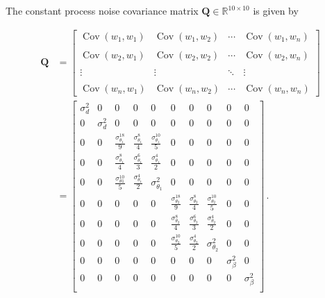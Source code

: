 The constant process noise covariance matrix $\mathbf{Q} \in \mathbb{R}^{10 \times 10}$ is given by

\begin{equation}
\begin{split}
\mathbf{Q} &= \begin{bmatrix}
 \operatorname{Cov}(w_1,w_1) & \operatorname{Cov}(w_1,w_2) & \cdots & \operatorname{Cov}(w_1,w_n) \\ \\
 \operatorname{Cov}(w_2,w_1) & \operatorname{Cov}(w_2,w_2) & \cdots & \operatorname{Cov}(w_2,w_n) \\ \\
 \vdots & \vdots & \ddots & \vdots \\ \\
 \operatorname{Cov}(w_n,w_1) & \operatorname{Cov}(w_n,w_2) & \cdots & \operatorname{Cov}(w_n,w_n)
\end{bmatrix} \\
&= \begin{bmatrix}
  \sigma^2_d & 0 & 0 & 0 & 0 & 0 & 0 & 0 & 0 & 0\\
  0 & \sigma^2_d & 0 & 0 & 0 & 0 & 0 & 0 & 0 & 0\\
  0 & 0 & \frac{\sigma^{18}_{\theta_1}}{9} & \frac{\sigma^8_{\theta_1}}{4} & \frac{\sigma^{10}_{\theta_1}}{5} & 0 & 0 & 0 & 0 & 0\\
  0 & 0 & \frac{\sigma^8_{\theta_1}}{4} & \frac{\sigma^6_{\theta_1}}{3} & \frac{\sigma^4_{\theta_1}}{2} & 0 & 0 & 0 & 0 & 0\\
  0 & 0 & \frac{\sigma^{10}_{\theta 1}}{5} & \frac{\sigma^4_{\theta_1}}{2} & \sigma^2_{\theta_1} & 0 & 0 & 0 & 0 & 0\\
  0 & 0 & 0 & 0 & 0 & \frac{\sigma^{18}_{\theta_2}}{9} & \frac{\sigma^8_{\theta_2}}{4} & \frac{\sigma^{10}_{\theta_2}}{5} & 0 & 0\\
  0 & 0 & 0 & 0 & 0 & \frac{\sigma^8_{\theta_2}}{4} & \frac{\sigma^6_{\theta_2}}{3} & \frac{\sigma^4_{\theta_2}}{2} & 0 & 0\\
  0 & 0 & 0 & 0 & 0 & \frac{\sigma^{10}_{\theta_2}}{5} & \frac{\sigma^4_{\theta_2}}{2} & \sigma^2_{\theta_2} & 0 & 0\\
  0 & 0 & 0 & 0 & 0 & 0 & 0 & 0 & \sigma^2_{\beta} & 0\\
  0 & 0 & 0 & 0 & 0 & 0 & 0 & 0 & 0 & \sigma^2_{\beta}\\
\end{bmatrix}\,.
\end{split}
\end{equation}

